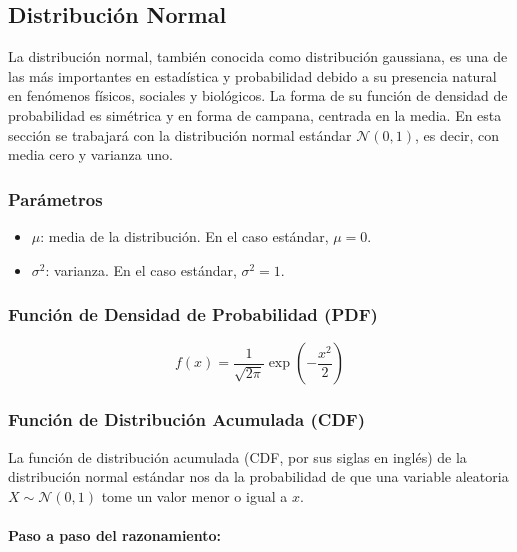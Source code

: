 \documentclass{article}
\begin{document}
\subsection{Distribución Normal}

La distribución normal, también conocida como distribución gaussiana, es una de las más importantes en estadística y probabilidad debido a su presencia natural en fenómenos físicos, sociales y biológicos. La forma de su función de densidad de probabilidad es simétrica y en forma de campana, centrada en la media. En esta sección se trabajará con la distribución normal estándar \( \mathcal{N}(0, 1) \), es decir, con media cero y varianza uno.

\subsubsection*{Parámetros}
\begin{itemize}
  \item $\mu$: media de la distribución. En el caso estándar, $\mu = 0$.
  \item $\sigma^2$: varianza. En el caso estándar, $\sigma^2 = 1$.
\end{itemize}

\subsubsection*{Función de Densidad de Probabilidad (PDF)}
\[
f(x) = \frac{1}{\sqrt{2\pi}} \exp\left(-\frac{x^2}{2}\right)
\]

\subsubsection*{Función de Distribución Acumulada (CDF)}

La función de distribución acumulada (CDF, por sus siglas en inglés) de la distribución normal estándar nos da la probabilidad de que una variable aleatoria \( X \sim \mathcal{N}(0,1) \) tome un valor menor o igual a \( x \).

\paragraph{Paso a paso del razonamiento:}
\end{document}

